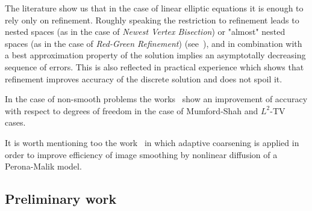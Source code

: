 \documentclass[enabledeprecatedfontcommands,cleardoublepage=empty,headsepline,twoside,11pt,DIV=15,BCOR=12mm,final]{scrartcl}
\begin{document}
The literature show us that in the case of linear elliptic equations it is enough to rely only on refinement. Roughly speaking the restriction to refinement leads to nested spaces (as in the case of \emph{Newest Vertex Bisection}) or "almost" nested spaces (as in the case of \emph{Red-Green Refinement}) (see~\cite{Verfurth:96}), and in combination with a best approximation property of the solution implies an asymptotally decreasing sequence of errors. This is also reflected in practical experience which shows that refinement improves accuracy of the discrete solution and does not spoil it.

In the case  of non-smooth problems the works~\cite{GuMoNo,Bar2015} show an improvement of accuracy with respect to degrees of freedom in the case of Mumford-Shah and $L^2$-TV cases. %

It is worth mentioning too  the work~\cite{BaeMik} in which adaptive coarsening is applied in order to improve efficiency of image smoothing by nonlinear diffusion of a Perona-Malik model.




\subsection{Preliminary work}\label{sec:prelim}
\end{document}
